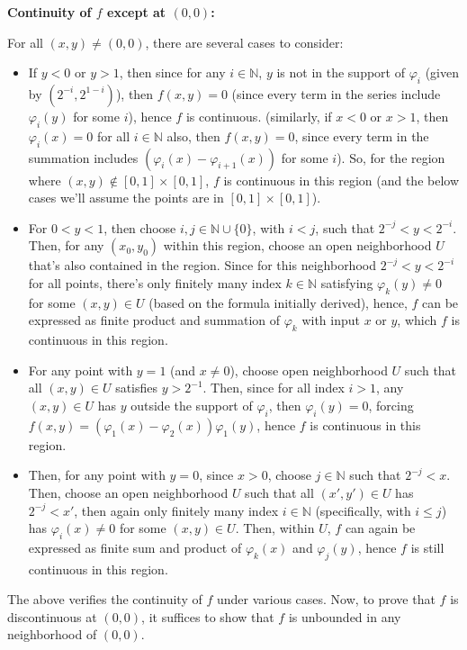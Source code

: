 \documentclass{article}
\begin{document}
\hfil

\textbf{Continuity of $f$ except at $(0,0)$:}

For all $(x,y)\neq (0,0)$, there are several cases to consider:
\begin{itemize}
    \item If $y<0$ or $y>1$, then since for any $i\in\mathbb{N}$, $y$ is not in the support of $\varphi_i$ (given by $(2^{-i},2^{1-i})$), then $f(x,y)=0$ (since every term in the series include $\varphi_i(y)$ for some $i$), hence $f$ is continuous. (similarly, if $x<0$ or $x>1$, then $\varphi_i(x)=0$ for all $i\in\mathbb{N}$ also, then $f(x,y)=0$, since every term in the summation includes $(\varphi_i(x)-\varphi_{i+1}(x))$ for some $i$). So, for the region where $(x,y)\notin [0,1]\times [0,1]$, $f$ is continuous in this region (and the below cases we'll assume the points are in $[0,1]\times [0,1]$).
    \item For $0<y<1$, then choose $i,j\in\mathbb{N}\cup\{0\}$, with $i<j$, such that $2^{-j}<y<2^{-i}$. Then, for any $(x_0,y_0)$ within this region, choose an open neighborhood $U$ that's also contained in the region. Since for this neighborhood $2^{-j}<y<2^{-i}$ for all points, there's only finitely many index $k\in\mathbb{N}$ satisfying $\varphi_k(y)\neq 0$ for some $(x,y)\in U$ (based on the formula initially derived), hence, $f$ can be expressed as finite product and summation of $\varphi_k$ with input $x$ or $y$, which $f$ is continuous in this region.
    \item For any point with $y=1$ (and $x\neq 0$), choose open neighborhood $U$ such that all $(x,y)\in U$ satisfies $y>2^{-1}$. Then, since for all index $i>1$, any $(x,y)\in U$ has $y$ outside the support of $\varphi_i$, then $\varphi_i(y)=0$, forcing $f(x,y)=(\varphi_1(x)-\varphi_2(x))\varphi_1(y)$, hence $f$ is continuous in this region.
    \item Then, for any point with $y=0$, since $x>0$, choose $j\in\mathbb{N}$ such that $2^{-j}<x$. Then, choose an open neighborhood $U$ such that all $(x',y')\in U$ has $2^{-j}<x'$, then again only finitely many index $i\in\mathbb{N}$ (specifically, with $i\leq j$) has $\varphi_i(x)\neq 0$ for some $(x,y)\in U$. Then, within $U$, $f$ can again be expressed as finite sum and product of $\varphi_k(x)$ and $\varphi_j(y)$, hence $f$ is still continuous in this region.
\end{itemize}

The above verifies the continuity of $f$ under various cases. Now, to prove that $f$ is discontinuous at $(0,0)$, it suffices to show that $f$ is unbounded in any neighborhood of $(0,0)$. 
\end{document}
